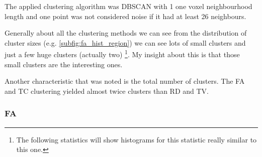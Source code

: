 \documentclass[a4paper,11pt]{report}
\begin{document}
    The applied clustering algorithm was DBSCAN with 1 one voxel neighbourhood length and one point was not considered noise if it had at least 26 neighbours.

    Generally about all the clustering methods we can see from the distribution of cluster sizes (e.g. \ref{subfig:fa_hist_region}) we can see lots of small clusters and just a few huge clusters (actually two) \footnote{The following statistics will show histograms for this statistic really similar to this one.}. My insight about this is that those small clusters are the interesting ones.

    Another characteristic that was noted is the total number of clusters. The FA and TC clustering yielded almost twice clusters than RD and TV.

    \newpage
    \subsubsection{FA}
\end{document}
